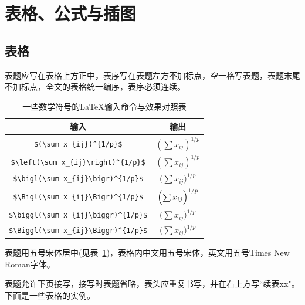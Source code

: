 \section{表格、公式与插图}\label{sec:ssss}
\subsection{表格}



表题应写在表格上方正中，表序写在表题左方不加标点，空一格写表题，表题末尾不加标点，全文的表格统一编序，表序必须连续。
\begin{table}[h]
\centering
\caption{一些数学符号的{\LaTeX}输入命令与效果对照表}\label{table:1}
\begin{tabular}{|c|c|}\hline
	输入 & 输出 \\\hline
	\verb=$(\sum x_{ij})^{1/p}$= & $(\sum x_{ij})^{1/p}$ \\\hline
	\verb=$\left(\sum x_{ij}\right)^{1/p}$= & $\left(\sum x_{ij}\right)^{1/p}$ \\\hline
	\verb=$\bigl(\sum x_{ij}\bigr)^{1/p}$= & $\bigl(\sum x_{ij}\bigr)^{1/p}$ \\\hline
	\verb=$\Bigl(\sum x_{ij}\Bigr)^{1/p}$= & $\Bigl(\sum x_{ij}\Bigr)^{1/p}$ \\\hline
	\verb=$\biggl(\sum x_{ij}\biggr)^{1/p}$= & $\biggl(\sum x_{ij}\biggr)^{1/p}$ \\\hline
	\verb=$\Biggl(\sum x_{ij}\Biggr)^{1/p}$= & $\Biggl(\sum x_{ij}\Biggr)^{1/p}$ \\
	\hline
\end{tabular}
\end{table}
表题用五号宋体居中(见表~\ref{table:1})，表格内中文用五号宋体，英文用五号Times
New Roman字体。

表题允许下页接写，接写时表题省略，表头应重复书写，并在右上方写``续表xx"。下面是一些表格的实例。
	
